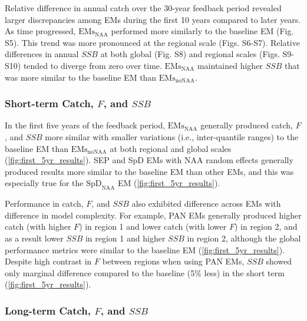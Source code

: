\documentclass[
  12pt,
]{article}
\begin{document}
Relative difference in annual catch over the 30-year feedback period
revealed larger discrepancies among EMs during the first 10 years
compared to later years. As time progressed,
\(\text{EMs}_{\scriptscriptstyle \text{NAA}}\) performed more similarly
to the baseline EM (Fig. S5). This trend was more pronounced at the
regional scale (Figs. S6-S7). Relative differences in annual \(SSB\) at
both global (Fig. S8) and regional scales (Figs. S9-S10) tended to
diverge from zero over time.
\(\text{EMs}_{\scriptscriptstyle \text{NAA}}\) maintained higher \(SSB\)
that was more similar to the baseline EM than
\(\text{EMs}_{\scriptscriptstyle \text{noNAA}}\).

\hypertarget{short-term-catch-f-and-ssb}{%
\subsubsection{\texorpdfstring{Short-term Catch, \(F\), and
\(SSB\)}{Short-term Catch, F, and SSB}}\label{short-term-catch-f-and-ssb}}

In the first five years of the feedback period,
\(\text{EMs}_{\scriptscriptstyle \text{NAA}}\) generally produced catch,
\(F\), and \(SSB\) more similar with smaller variations (i.e.,
inter-quantile ranges) to the baseline EM than
\(\text{EMs}_{\scriptscriptstyle \text{noNAA}}\) at both regional and
global scales (\autoref{fig:first_5yr_results}). SEP and SpD EMs with
NAA random effects generally produced results more similar to the
baseline EM than other EMs, and this was especially true for the
\(\text{SpD}_{\scriptscriptstyle \text{NAA}}\) EM
(\autoref{fig:first_5yr_results}).

Performance in catch, \(F\), and \(SSB\) also exhibited difference
across EMs with difference in model complexity. For example, PAN EMs
generally produced higher catch (with higher \(F\)) in region 1 and
lower catch (with lower \(F\)) in region 2, and as a result lower
\(SSB\) in region 1 and higher \(SSB\) in region 2, although the global
performance metrics were similar to the baseline EM
(\autoref{fig:first_5yr_results}). Despite high contrast in \(F\)
between regions when using PAN EMs, \(SSB\) showed only marginal
difference compared to the baseline (5\% less) in the short term
(\autoref{fig:first_5yr_results}).

\hypertarget{long-term-catch-f-and-ssb}{%
\subsubsection{\texorpdfstring{Long-term Catch, \(F\), and
\(SSB\)}{Long-term Catch, F, and SSB}}\label{long-term-catch-f-and-ssb}}
\end{document}
